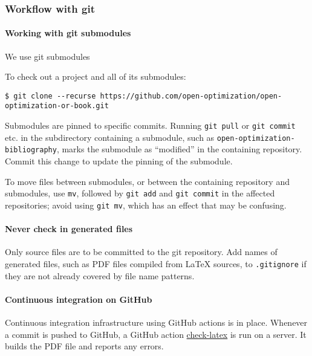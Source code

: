 \hypertarget{workflow-with-git}{%
\subsubsection{Workflow with git}\label{workflow-with-git}}

\hypertarget{working-with-git-submodules}{%
\paragraph{Working with git
submodules}\label{working-with-git-submodules}}

We use git submodules

To check out a project and all of its submodules:

\begin{verbatim}
$ git clone --recurse https://github.com/open-optimization/open-optimization-or-book.git
\end{verbatim}

Submodules are pinned to specific commits. Running \texttt{git\ pull} or
\texttt{git\ commit} etc. in the subdirectory containing a submodule,
such as \texttt{open-optimization-bibliography}, marks the submodule as
``modified'' in the containing repository. Commit this change to update
the pinning of the submodule.

To move files between submodules, or between the containing repository
and submodules, use \texttt{mv}, followed by \texttt{git\ add} and
\texttt{git\ commit} in the affected repositories; avoid using
\texttt{git\ mv}, which has an effect that may be confusing.

\hypertarget{never-check-in-generated-files}{%
\paragraph{Never check in generated
files}\label{never-check-in-generated-files}}

Only source files are to be committed to the git repository. Add names
of generated files, such as PDF files compiled from LaTeX sources, to
\texttt{.gitignore} if they are not already covered by file name
patterns.

\hypertarget{continuous-integration-on-github}{%
\paragraph{Continuous integration on
GitHub}\label{continuous-integration-on-github}}

Continuous integration infrastructure using GitHub actions is in place.
Whenever a commit is pushed to GitHub, a GitHub action
\href{.github/workflows/check-latex.yml}{check-latex} is run on a
server. It builds the PDF file and reports any errors.


